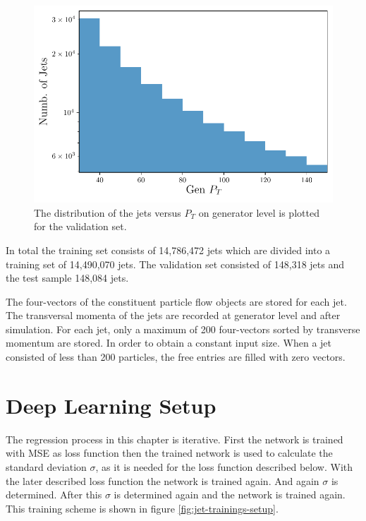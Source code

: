 \documentclass[12pt, a4paper]{thesis}
\begin{document}
\begin{figure}[hbtp]
  \centering
  \includegraphics[width=.9\linewidth]{../images/jet_distri.pdf}
  \caption{ The distribution of the jets versus \(P_T\) on generator
    level is plotted for the validation set.}
  \label{jet_distri}
\end{figure}

In total the training set consists of 14,786,472 jets which are
divided into a training set of 14,490,070 jets. The validation set
consisted of 148,318 jets and the test sample 148,084 jets.

The four-vectors of the constituent particle flow objects are stored
for each jet. The transversal momenta of the jets are recorded at
generator level and after simulation. For each jet, only a maximum of
200 four-vectors sorted by transverse momentum are stored. In order to
obtain a constant input size. When a jet consisted of less than 200
particles, the free entries are filled with zero vectors.

\clearpage
\section{Deep Learning Setup}
\label{sec:orgf3b24cc}

The regression process in this chapter is iterative. First the network
is trained with MSE as loss function then the trained network is used
to calculate the standard deviation $\sigma$, as it is needed for the
loss function described below. With the later described loss function
the network is trained again. And again $\sigma$ is determined. After
this $\sigma$ is determined again and the network is trained
again. This training scheme is shown in figure \ref{fig:jet-trainings-setup}.
\end{document}
